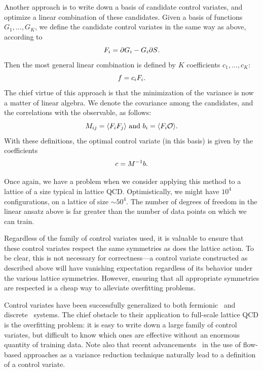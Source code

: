 \documentclass[12pt]{article}
\begin{document}
Another approach is to write down a basis of candidate control variates, and optimize a linear combination of these candidates. Given a basis of functions $G_1,\ldots,G_K$, we define the candidate control variates in the same way as above, according to
\begin{equation}
    F_i = \partial G_i - G_i \partial S\text.
\end{equation}
Then the most general linear combination is defined by $K$ coefficients $c_1,\ldots,c_K$:
\begin{equation}
    f = c_i F_i
    \text.
\end{equation}
The chief virtue of this approach is that the minimization of the variance is now a matter of linear algebra. We denote the covariance among the candidates, and the correlations with the observable, as follows:
\begin{equation}
    M_{ij} = \langle F_i F_j \rangle \text{ and } b_i = \langle F_i \mathcal O \rangle
    \text.
\end{equation}
With these definitions, the optimal control variate (in this basis) is given by the coefficients
\begin{equation}
    c = M^{-1} b
    \text.
\end{equation}

Once again, we have a problem when we consider applying this method to a lattice of a size typical in lattice QCD. Optimistically, we might have $10^4$ configurations, on a lattice of size $\sim 50^4$. The number of degrees of freedom in the linear ansatz above is far greater than the number of data points on which we can train.

Regardless of the family of control variates used, it is valuable to ensure that these control variates respect the same symmetries as does the lattice action. To be clear, this is not necessary for correctness---a control variate constructed as described above will have vanishing expectation regardless of its behavior under the various lattice symmetries. However, ensuring that all appropriate symmetries are respected is a cheap way to alleviate overfitting problems.

Control variates have been successfully generalized to both fermionic~\cite{Lawrence:2024xsi} and discrete~\cite{Lawrence:2023cft} systems. The chief obstacle to their application to full-scale lattice QCD is the overfitting problem: it is easy to write down a large family of control variates, but difficult to know which ones are effective without an enormous quantity of training data.
Note also that recent advancements~\cite{Abbott:2026ylv,Abbott:2026vui,Butti:2026gwi} in the use of flow-based approaches as a variance reduction technique naturally lead to a definition of a control variate.
\end{document}

